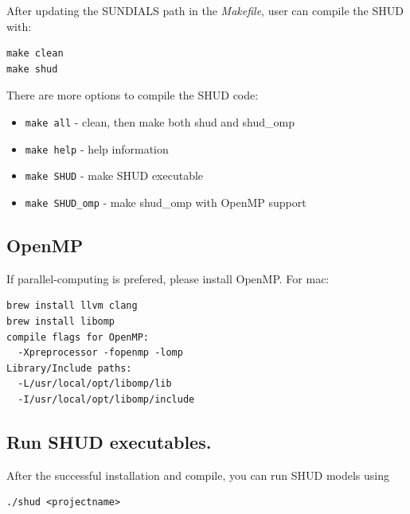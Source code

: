 \documentclass[]{scrbook}
\providecommand{\tightlist}{%
  \setlength{\itemsep}{0pt}\setlength{\parskip}{0pt}}
\begin{document}
After updating the SUNDIALS path in the \emph{Makefile}, user can
compile the SHUD with:

\begin{verbatim}
make clean
make shud
\end{verbatim}

There are more options to compile the SHUD code:

\begin{itemize}
\tightlist
\item
  \texttt{make\ all} - clean, then make both shud and shud\_omp
\item
  \texttt{make\ help} - help information
\item
  \texttt{make\ SHUD} - make SHUD executable
\item
  \texttt{make\ SHUD\_omp} - make shud\_omp with OpenMP support
\end{itemize}

\subsection{OpenMP}\label{openmp}

If parallel-computing is prefered, please install OpenMP. For mac:

\begin{verbatim}
brew install llvm clang
brew install libomp
compile flags for OpenMP: 
  -Xpreprocessor -fopenmp -lomp
Library/Include paths:
  -L/usr/local/opt/libomp/lib 
  -I/usr/local/opt/libomp/include
\end{verbatim}

\subsection{Run SHUD executables.}\label{run-shud-executables.}

After the successful installation and compile, you can run SHUD models
using

\begin{verbatim}
./shud <projectname>
\end{verbatim}
\end{document}
